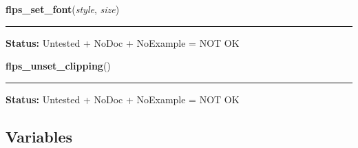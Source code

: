     \label{xformslib:library:flps_set_font}

    \vspace{0.5ex}

\hspace{.8\funcindent}\begin{boxedminipage}{\funcwidth}

    \raggedright \textbf{flps\_set\_font}(\textit{style}, \textit{size})

    \vspace{-1.5ex}

    \rule{\textwidth}{0.5\fboxrule}
\setlength{\parskip}{2ex}
\setlength{\parskip}{1ex}
\textbf{Status:} Untested + NoDoc + NoExample = NOT OK



    \end{boxedminipage}

    \label{xformslib:library:flps_unset_clipping}

    \vspace{0.5ex}

\hspace{.8\funcindent}\begin{boxedminipage}{\funcwidth}

    \raggedright \textbf{flps\_unset\_clipping}()

    \vspace{-1.5ex}

    \rule{\textwidth}{0.5\fboxrule}
\setlength{\parskip}{2ex}
\setlength{\parskip}{1ex}
\textbf{Status:} Untested + NoDoc + NoExample = NOT OK



    \end{boxedminipage}



  \subsection{Variables}

